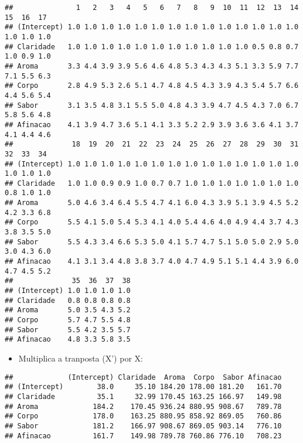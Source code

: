 \documentclass[
]{article}
\newenvironment{Shaded}{\begin{snugshade}}{\end{snugshade}}
\newcommand{\KeywordTok}[1]{\textcolor[rgb]{0.13,0.29,0.53}{\textbf{#1}}}
\newcommand{\NormalTok}[1]{#1}
\newcommand{\OperatorTok}[1]{\textcolor[rgb]{0.81,0.36,0.00}{\textbf{#1}}}
\newcommand{\StringTok}[1]{\textcolor[rgb]{0.31,0.60,0.02}{#1}}
\providecommand{\tightlist}{%
  \setlength{\itemsep}{0pt}\setlength{\parskip}{0pt}}
\begin{document}
\begin{verbatim}
##               1   2   3   4   5   6   7   8   9  10  11  12  13  14  15  16  17
## (Intercept) 1.0 1.0 1.0 1.0 1.0 1.0 1.0 1.0 1.0 1.0 1.0 1.0 1.0 1.0 1.0 1.0 1.0
## Claridade   1.0 1.0 1.0 1.0 1.0 1.0 1.0 1.0 1.0 1.0 1.0 0.5 0.8 0.7 1.0 0.9 1.0
## Aroma       3.3 4.4 3.9 3.9 5.6 4.6 4.8 5.3 4.3 4.3 5.1 3.3 5.9 7.7 7.1 5.5 6.3
## Corpo       2.8 4.9 5.3 2.6 5.1 4.7 4.8 4.5 4.3 3.9 4.3 5.4 5.7 6.6 4.4 5.6 5.4
## Sabor       3.1 3.5 4.8 3.1 5.5 5.0 4.8 4.3 3.9 4.7 4.5 4.3 7.0 6.7 5.8 5.6 4.8
## Afinacao    4.1 3.9 4.7 3.6 5.1 4.1 3.3 5.2 2.9 3.9 3.6 3.6 4.1 3.7 4.1 4.4 4.6
##              18  19  20  21  22  23  24  25  26  27  28  29  30  31  32  33  34
## (Intercept) 1.0 1.0 1.0 1.0 1.0 1.0 1.0 1.0 1.0 1.0 1.0 1.0 1.0 1.0 1.0 1.0 1.0
## Claridade   1.0 1.0 0.9 0.9 1.0 0.7 0.7 1.0 1.0 1.0 1.0 1.0 1.0 1.0 0.8 1.0 1.0
## Aroma       5.0 4.6 3.4 6.4 5.5 4.7 4.1 6.0 4.3 3.9 5.1 3.9 4.5 5.2 4.2 3.3 6.8
## Corpo       5.5 4.1 5.0 5.4 5.3 4.1 4.0 5.4 4.6 4.0 4.9 4.4 3.7 4.3 3.8 3.5 5.0
## Sabor       5.5 4.3 3.4 6.6 5.3 5.0 4.1 5.7 4.7 5.1 5.0 5.0 2.9 5.0 3.0 4.3 6.0
## Afinacao    4.1 3.1 3.4 4.8 3.8 3.7 4.0 4.7 4.9 5.1 5.1 4.4 3.9 6.0 4.7 4.5 5.2
##              35  36  37  38
## (Intercept) 1.0 1.0 1.0 1.0
## Claridade   0.8 0.8 0.8 0.8
## Aroma       5.0 3.5 4.3 5.2
## Corpo       5.7 4.7 5.5 4.8
## Sabor       5.5 4.2 3.5 5.7
## Afinacao    4.8 3.3 5.8 3.5
\end{verbatim}

\begin{itemize}
\tightlist
\item
  Multiplica a tranposta (X') por X:
\end{itemize}

\begin{Shaded}
\end{Shaded}

\begin{verbatim}
##             (Intercept) Claridade  Aroma  Corpo  Sabor Afinacao
## (Intercept)        38.0     35.10 184.20 178.00 181.20   161.70
## Claridade          35.1     32.99 170.45 163.25 166.97   149.98
## Aroma             184.2    170.45 936.24 880.95 908.67   789.78
## Corpo             178.0    163.25 880.95 858.92 869.05   760.86
## Sabor             181.2    166.97 908.67 869.05 903.14   776.10
## Afinacao          161.7    149.98 789.78 760.86 776.10   708.23
\end{verbatim}
\end{document}

